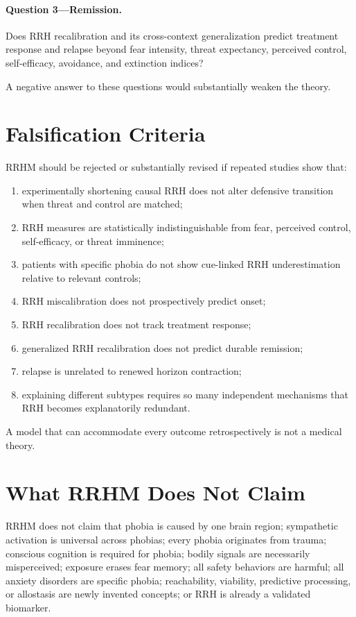 \documentclass[11pt]{article}
\begin{document}
\paragraph{Question 3---Remission.} Does RRH recalibration and its cross-context generalization predict treatment response and relapse beyond fear intensity, threat expectancy, perceived control, self-efficacy, avoidance, and extinction indices?

A negative answer to these questions would substantially weaken the theory.

\section{Falsification Criteria}

RRHM should be rejected or substantially revised if repeated studies show that:
\begin{enumerate}[label=\arabic*.]
\item experimentally shortening causal RRH does not alter defensive transition when threat and control are matched;
\item RRH measures are statistically indistinguishable from fear, perceived control, self-efficacy, or threat imminence;
\item patients with specific phobia do not show cue-linked RRH underestimation relative to relevant controls;
\item RRH miscalibration does not prospectively predict onset;
\item RRH recalibration does not track treatment response;
\item generalized RRH recalibration does not predict durable remission;
\item relapse is unrelated to renewed horizon contraction;
\item explaining different subtypes requires so many independent mechanisms that RRH becomes explanatorily redundant.
\end{enumerate}

A model that can accommodate every outcome retrospectively is not a medical theory.

\section{What RRHM Does Not Claim}

RRHM does not claim that phobia is caused by one brain region; sympathetic activation is universal across phobias; every phobia originates from trauma; conscious cognition is required for phobia; bodily signals are necessarily misperceived; exposure erases fear memory; all safety behaviors are harmful; all anxiety disorders are specific phobia; reachability, viability, predictive processing, or allostasis are newly invented concepts; or RRH is already a validated biomarker.
\end{document}

